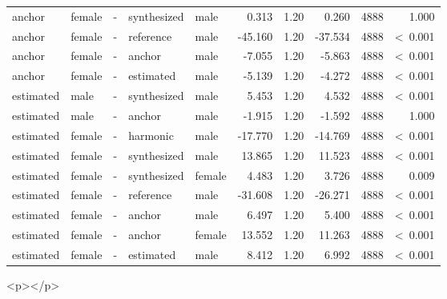 \documentclass[a4paper,man,hidelinks,floatsintext]{apa7}
\begin{document}
\begin{table}[!htbp]
\begin{adjustbox}{max size={\columnwidth}{\textheight}}
\begin{tabular}{llrllrrrrr}
anchor      & female & - & synthesized & male   &      0.313 & 1.20 &   0.260 & 4888 &            1.000 \\
anchor      & female & - & reference   & male   &    -45.160 & 1.20 & -37.534 & 4888 &  \textless~0.001 \\
anchor      & female & - & anchor      & male   &     -7.055 & 1.20 &  -5.863 & 4888 &  \textless~0.001 \\
anchor      & female & - & estimated   & male   &     -5.139 & 1.20 &  -4.272 & 4888 &  \textless~0.001 \\
estimated   & male   & - & synthesized & male   &      5.453 & 1.20 &   4.532 & 4888 &  \textless~0.001 \\
estimated   & male   & - & anchor      & male   &     -1.915 & 1.20 &  -1.592 & 4888 &            1.000 \\
estimated   & female & - & harmonic    & male   &    -17.770 & 1.20 & -14.769 & 4888 &  \textless~0.001 \\
estimated   & female & - & synthesized & male   &     13.865 & 1.20 &  11.523 & 4888 &  \textless~0.001 \\
estimated   & female & - & synthesized & female &      4.483 & 1.20 &   3.726 & 4888 &            0.009 \\
estimated   & female & - & reference   & male   &    -31.608 & 1.20 & -26.271 & 4888 &  \textless~0.001 \\
estimated   & female & - & anchor      & male   &      6.497 & 1.20 &   5.400 & 4888 &  \textless~0.001 \\
estimated   & female & - & anchor      & female &     13.552 & 1.20 &  11.263 & 4888 &  \textless~0.001 \\
estimated   & female & - & estimated   & male   &      8.412 & 1.20 &   6.992 & 4888 &  \textless~0.001 \\
\hline
\end{tabular}
\end{adjustbox}
\begin{tablenotes} {
\small
}
\end{tablenotes}
\end{table}
      
        <p></p>
      
\end{document}

